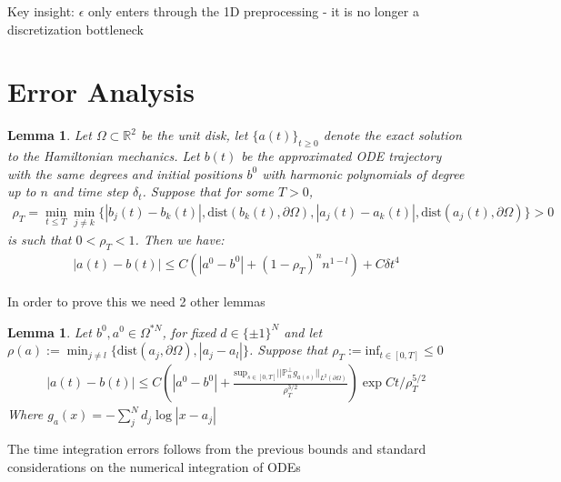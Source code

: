 \documentclass[12pt, a4paper]{article}
\theoremstyle{plain}
\newtheorem{lemma}[theorem]{Lemma}
\theoremstyle{definition}
\newcommand{\R}{\mathbb{R}}
\begin{document}
Key insight: $\epsilon$ only enters through the 1D preprocessing - it is no longer a discretization bottleneck


\section{Error Analysis}

\begin{lemma}
  Let $\Omega \subset \R^2$ be the unit disk, let $\{a(t)\}_{t\geq 0}$ denote the exact solution to the Hamiltonian mechanics.
  Let $b(t)$ be the approximated ODE trajectory with the same degrees and initial positions $b^0$ with harmonic polynomials of degree up to $n$
  and time step $\delta_t$. Suppose that for some $T>0$,
  \begin{align}
  \rho_T = \min_{t\leq T} \min_{j\neq k} \{ |b_j (t) - b_k  (t)|, \text{dist} (b_k(t) , \partial \Omega), |a_j (t) - a_k  (t)|, \text{dist} (a_j(t) , \partial \Omega)\}>0
  \end{align}
  is such that $0 < \rho_T < 1$. Then we have:
  \begin{align}
    |a(t) - b(t)| \leq C (|a^0 -b^0| + (1- \rho_T)^n n^{1-l}) + C \delta t^4
  \end{align}
\end{lemma}

In order to prove this we need 2 other lemmas 

\begin{lemma}
  Let $b^0, a^0 \in \Omega^{*N}$, for fixed $d \in \{\pm1\}^N$
  and let $\rho(a) := \min_{j\neq l} \{\text{dist}(a_j, \partial\Omega) , |a_j - a_l|\}$.
  Suppose that $\rho_T:= \text{inf}_{t\in [0,T]} \leq 0$
  \begin{align}
  |a(t) - b(t)| \leq  C (|a^0-b^0| + \frac{\text{sup}_{s\in [0,T]}||\mathbb{P}^\perp_n g_{a(s)}||_{L^2(\partial \Omega)}}{\rho^{3/2}_T})\exp{C t /\rho^{5/2}_T}
  \end{align}
  Where $g_a(x) = - \sum^N_j d_j \log |x-a_j|$
\end{lemma} 

The time integration errors follows from the previous bounds and standard considerations on the numerical integration of ODEs
\end{document}
